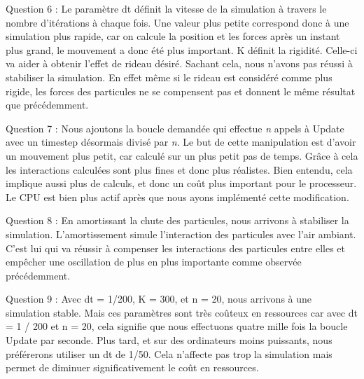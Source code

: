 \documentclass[a4paper,12pt]{article}
\begin{document}
Question 6 : Le paramètre \og{}dt\fg{} définit la vitesse de la simulation à travers le nombre d'itérations à chaque fois. Une valeur plus petite correspond donc à une simulation plus rapide, car on calcule la position et les forces après un instant plus grand, le mouvement a donc été plus important.
K définit la rigidité. Celle-ci va aider à obtenir l'effet de rideau désiré. Sachant cela, nous n'avons pas réussi à stabiliser la simulation. En effet même si le rideau est considéré comme plus rigide, les forces des particules ne se compensent pas et donnent le même résultat que précédemment.

Question 7 : Nous ajoutons la boucle demandée qui effectue \textit{n} appels à \og{}Update\fg{} avec un timestep désormais divisé par \textit{n}. Le but de cette manipulation est d'avoir un mouvement plus petit, car calculé sur un plus petit pas de temps. Grâce à cela les interactions calculées sont plus fines et donc plus réalistes. Bien entendu, cela implique aussi plus de calculs, et donc un coût plus important pour le processeur. Le CPU est bien plus actif après que nous ayons implémenté cette modification. 

Question 8 : En amortissant la chute des particules, nous arrivons à stabiliser la simulation. L'amortissement simule l'interaction des particules avec l'air ambiant. C'est lui qui va réussir à compenser les interactions des particules entre elles et empêcher une oscillation de plus en plus importante comme observée précédemment. 

Question 9 : 	Avec dt = 1/200, K = 300, et n = 20, nous arrivons à une simulation stable. Mais ces paramètres sont très coûteux en ressources car avec dt = 1 / 200 et n = 20, cela signifie que nous effectuons quatre mille fois la boucle \og{}Update\fg{} par seconde. Plus tard, et sur des ordinateurs moins puissants, nous préférerons utiliser un dt de 1/50. Cela n'affecte pas trop la simulation mais permet de diminuer significativement le coût en ressources.
\end{document}
